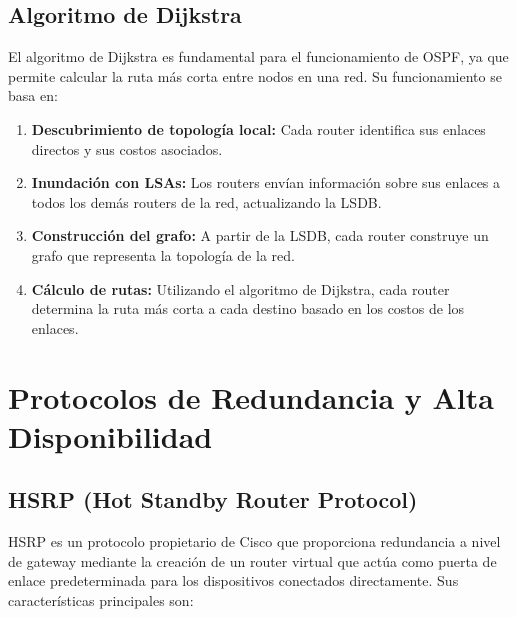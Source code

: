 \subsection{Algoritmo de Dijkstra}
El algoritmo de Dijkstra es fundamental para el funcionamiento de OSPF, ya que permite calcular la ruta más corta entre nodos en una red. Su funcionamiento se basa en:
\begin{enumerate}
    \item \textbf{Descubrimiento de topología local:} Cada router identifica sus enlaces directos y sus costos asociados.
    \item \textbf{Inundación con LSAs:} Los routers envían información sobre sus enlaces a todos los demás routers de la red, actualizando la LSDB.
    \item \textbf{Construcción del grafo:} A partir de la LSDB, cada router construye un grafo que representa la topología de la red.
    \item \textbf{Cálculo de rutas:} Utilizando el algoritmo de Dijkstra, cada router determina la ruta más corta a cada destino basado en los costos de los enlaces.
\end{enumerate}

\section{Protocolos de Redundancia y Alta Disponibilidad}
\subsection{HSRP (Hot Standby Router Protocol)}
\label{subsec:hsrp}
HSRP es un protocolo propietario de Cisco que proporciona redundancia a nivel de gateway mediante la creación de un router virtual que actúa como puerta de enlace 
predeterminada para los dispositivos conectados directamente. Sus características principales son: \\ \\

